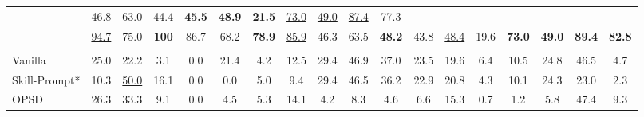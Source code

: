 \begin{table}[t]
{\begin{tabular}{l CCCCCCC CCCCCCCC CC }
        & 46.8 & 63.0 & 44.4 & \textbf{45.5} & \textbf{48.9} & \textbf{21.5} & \underline{73.0} & \underline{49.0}
        & \underline{87.4} & 77.3
        \\
    \textbf{\methodname{}}
        & \underline{94.7} & 75.0 & \textbf{100} & 86.7 & 68.2 & \textbf{78.9} & \underline{85.9}
        & 46.3 & 63.5 & \textbf{48.2} & 43.8 & \underline{48.4} & 19.6 & \textbf{73.0} & \textbf{49.0}
        & \textbf{89.4} & \textbf{82.8}
        \\

    \midrule

      \\

    Vanilla
        & 25.0 & 22.2 & 3.1 & 0.0 & 21.4 & 4.2 & 12.5
        & 29.4 & 46.9 & 37.0 & 23.5 & 19.6 & 6.4 & 10.5 & 24.8
        & 46.5 & 4.7
        \\
    Skill-Prompt*
        & 10.3 & \underline{50.0} & 16.1 & 0.0 & 0.0 & 5.0 & 9.4
        & 29.4 & 46.5 & 36.2 & 22.9 & 20.8 & 4.3 & 10.1 & 24.3
        & 23.0 & 2.3
        \\
    OPSD
        & 26.3 & 33.3 & 9.1 & 0.0 & 4.5 & 5.3 & 14.1
        & 4.2 & 8.3 & 4.6 & 6.6 & 15.3 & 0.7 & 1.2 & 5.8
        & 47.4 & 9.3
        \\


\end{tabular}}
\end{table}
